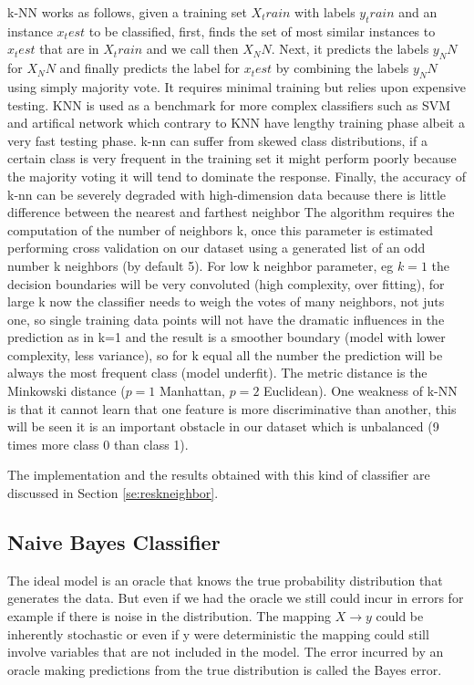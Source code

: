 \documentclass[11pt]{article}
\theoremstyle{definition}
\theoremstyle{remark}
\begin{document}
{k-NN works as follows, given a training set $X_train$ with labels $y_train$ and an instance $x_test$ to be classified, first, finds the set of most similar instances to $x_test$ that are in $X_train$ and we call then $X_NN$. Next, it predicts the labels $y_NN$ for $X_NN$ and finally predicts the label for $x_test$ by combining the labels $y_NN$ using simply majority vote. 
It requires minimal training but relies upon expensive testing. KNN is used as a benchmark for more complex classifiers such as SVM and artifical network which contrary to KNN have lengthy training phase albeit a very fast testing phase. k-nn can suffer from skewed class distributions, if a certain class is very frequent in the training set it might perform poorly because the majority voting it will tend to dominate the response. Finally, the accuracy of k-nn can be severely degraded with high-dimension data because there is little difference between the nearest and farthest neighbor
The algorithm requires the computation of the number of neighbors k, once this parameter is estimated performing cross validation on our dataset using a generated list of an odd number k neighbors (by default 5). For low k neighbor parameter, eg $k=1$ the decision boundaries will be very convoluted (high complexity, over fitting), for large k now the classifier needs to weigh the votes of many neighbors, not juts one, so single training data points will not have the dramatic influences in the prediction as in k=1 and the result is a smoother boundary (model with lower complexity, less variance), so for k equal all the number the prediction will be always the most frequent class (model underfit). The metric distance is the Minkowski distance ($p=1$ Manhattan, $p=2$ Euclidean). 
One weakness of k-NN  is that it cannot learn that one feature is more discriminative than another, this will be seen it is an important obstacle in our dataset which is unbalanced (9 times more class 0 than class 1).

The implementation and the results obtained with this kind of classifier are discussed in Section \ref{se:reskneighbor}.

\subsection{Naive Bayes Classifier}
\label{sse:naivebayes}
The ideal model is an oracle that knows the true probability distribution that generates the data. But even if we had the oracle we still could incur in errors for example if there is noise in the distribution.
The mapping $X \to y$ could be inherently stochastic or even if y were deterministic the mapping could still involve variables that are not included in the model. The error incurred by an oracle making predictions from the true distribution is called the Bayes error.

}
\end{document}
